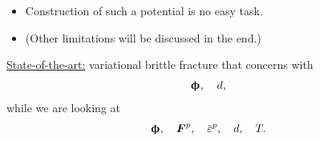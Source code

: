 \begin{frame}
\begin{columns}
\begin{column}{0.4\textwidth}
\begin{itemize}
        \item Construction of such a potential is no easy task.
        \item (Other limitations will be discussed in the end.)
      \end{itemize}
      \pause
      \begin{block}{}
        \underline{State-of-the-art:} variational brittle fracture that concerns with
        \begin{align*}
          \boldsymbol{\upphi}, \quad d,
        \end{align*}
        while we are looking at
        \begin{align*}
          \bs{\upphi}, \quad \defgrad^p, \quad \ep, \quad d, \quad T.
        \end{align*}
      \end{block}
    \end{column}
  \end{columns}
\end{frame}

